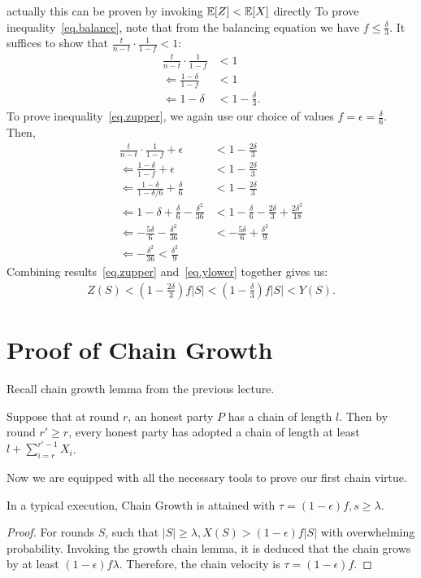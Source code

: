 {\color{red} actually this can be proven by invoking $\operatorname{\mathbb{E}}[Z] < \operatorname{\mathbb{E}}[X]$ directly}
To prove inequality~\ref{eq.balance}, note that from the balancing equation we have $f \leq \frac{\delta}{3}$. It suffices to show that $\frac{t}{n-t}\cdot\frac{1}{1-f} < 1$:
\begin{align}
\frac{t}{n-t}\cdot\frac{1}{1-f} &< 1\\
\Leftarrow \frac{1-\delta}{1-f} &< 1\\
\Leftarrow 1-\delta &< 1 -\frac{\delta}{3}.
\end{align}
To prove inequality~\ref{eq.zupper}, we again use our choice of values $f = \epsilon = \frac{\delta}{6}$. Then,
\begin{align}
    \frac{t}{n-t}\cdot\frac{1}{1-f} + \epsilon &< 1 - \frac{2\delta}{3}\\
    \Leftarrow \frac{1-\delta}{1-f} + \epsilon &< 1-\frac{2\delta}{3}\\
    \Leftarrow \frac{1-\delta}{1-\delta/6} + \frac{\delta}{6} &< 1 - \frac{2\delta}{3}\\
    \Leftarrow 1-\delta + \frac{\delta}{6} -\frac{\delta^2}{36} &< 1- \frac{\delta}{6} -\frac{2\delta}{3} + \frac{2\delta^2}{18}\\
    \Leftarrow -\frac{5\delta}{6}-\frac{\delta^2}{36} &< -\frac{5\delta}{6} + \frac{\delta^2}{9}\\
    \Leftarrow -\frac{\delta^2}{36} < \frac{\delta^2}{9}
\end{align}
Combining results~\ref{eq.zupper} and~\ref{eq.ylower} together gives us:
\begin{align}
Z(S) < \left(1 - \frac{2\delta}{3}\right)f|S| <  \left(1 - \frac{\delta}{3}\right)f|S| <
Y(S).
\end{align}

\section{Proof of Chain Growth}
Recall chain growth lemma from the previous lecture.
\begin {lemma}
    Suppose that at round $r$, an honest party $P$ has a chain of length $l$. Then by round $r' \geq r$, every honest party has adopted a chain of length at least $l + \sum_{i=r}^{r'-1} X_i$.
\end {lemma}
Now we are equipped with all the necessary tools to prove our first chain virtue.

\begin{theorem}\label{thm.chain-growth}
In a typical execution, Chain Growth is attained with $\tau = (1-\epsilon)f, s \geq \lambda$.
\end{theorem}
\begin{proof}
For rounds $S$, such that $|S| \geq \lambda, X(S) > (1-\epsilon)f|S|$ with overwhelming probability. Invoking the growth chain lemma, it is deduced that the chain grows by at least $(1-\epsilon)f\lambda$. Therefore, the chain velocity is $\tau = (1-\epsilon)f$.
\end{proof}


